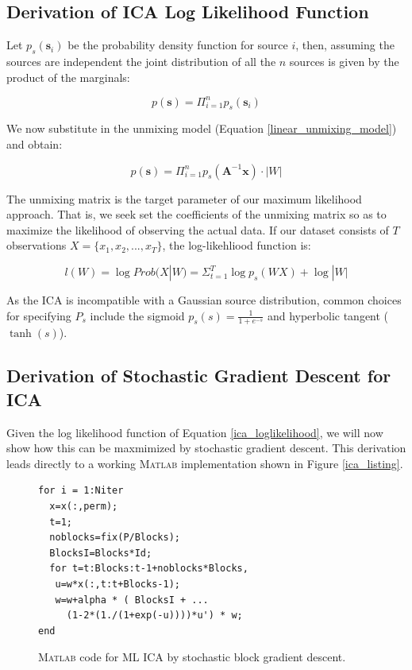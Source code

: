 \documentclass[11pt, oneside, a4paper]{report}
\begin{document}
\subsection{Derivation of ICA Log Likelihood Function}\label{ml_ica}

Let $p_s(\boldsymbol{s}_i)$ be the probability density function for source $i$, then, assuming the sources are independent the joint distribution of all the $n$ sources is given by the product of the marginals:

\begin{equation}
  p(\boldsymbol{s}) = \Pi_{i=1}^n p_s(\boldsymbol{s}_i)
\end{equation}

We now substitute in the unmixing model (Equation \ref{linear_unmixing_model}) and obtain:

\begin{equation}
  p(\boldsymbol{s}) = \Pi_{i=1}^n p_s(\boldsymbol{A}^{-1}\boldsymbol{x}) \cdot |W|
\end{equation}

The unmixing matrix is the target parameter of our maximum likelihood approach. That is, we seek set the coefficients of the unmixing matrix so as to maximize the likelihood of observing the actual data. If our dataset consists of $T$ observations $X = \{x_1,x_2,...,x_T\}$, the log-likehliood function is:

\begin{equation}\label{ica_loglikelihood}
  l(W) =\log Prob(X|W)= \Sigma_{t=1}^T \log p_s(WX)+\log |W|
\end{equation}

As the ICA is incompatible with a Gaussian source distribution, common choices for specifying $P_s$ include the sigmoid $p_s(s) = \frac{1}{1+e^{-s}}$ and hyperbolic tangent ($\tanh(s)$).

\subsection{Derivation of Stochastic Gradient Descent for ICA}

Given the log likelihood function of Equation \ref{ica_loglikelihood},
we will now show how this can be maxmimized by stochastic gradient
descent. This derivation leads directly to a working \textsc{Matlab}
implementation shown in Figure \ref{ica_listing}.


\begin{figure}[!htpb]\label{ica_listing}
  \begin{lstlisting}[frame=single]
for i = 1:Niter
  x=x(:,perm);
  t=1;
  noblocks=fix(P/Blocks);
  BlocksI=Blocks*Id;
  for t=t:Blocks:t-1+noblocks*Blocks,
   u=w*x(:,t:t+Blocks-1); 
   w=w+alpha * ( BlocksI + ...
     (1-2*(1./(1+exp(-u))))*u') * w;
end
  \end{lstlisting}
  \caption{\textsc{Matlab} code for ML ICA by stochastic block gradient descent.}
  \label{mlica_code}
\end{figure}
\end{document}
